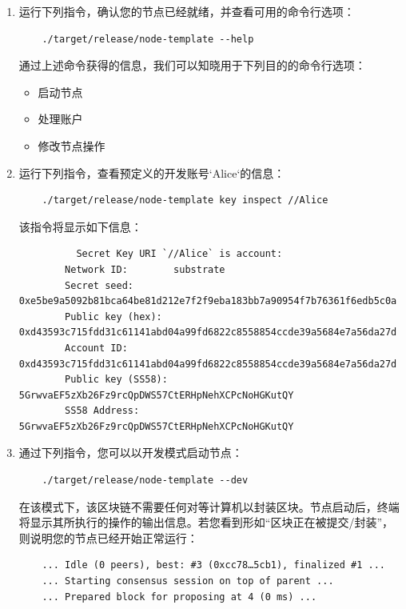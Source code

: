 \begin{enumerate}
  \item 运行下列指令，确认您的节点已经就绪，并查看可用的命令行选项：
        \begin{lstlisting}
    ./target/release/node-template --help
  \end{lstlisting}

        通过上述命令获得的信息，我们可以知晓用于下列目的的命令行选项：
        \begin{itemize}
          \item 启动节点
          \item 处理账户
          \item 修改节点操作
        \end{itemize}

  \item 运行下列指令，查看预定义的开发账号`Alice`的信息：
        \begin{lstlisting}
    ./target/release/node-template key inspect //Alice
  \end{lstlisting}
        该指令将显示如下信息：
        \begin{lstlisting}
          Secret Key URI `//Alice` is account:
        Network ID:        substrate
        Secret seed:       0xe5be9a5092b81bca64be81d212e7f2f9eba183bb7a90954f7b76361f6edb5c0a
        Public key (hex):  0xd43593c715fdd31c61141abd04a99fd6822c8558854ccde39a5684e7a56da27d
        Account ID:        0xd43593c715fdd31c61141abd04a99fd6822c8558854ccde39a5684e7a56da27d
        Public key (SS58): 5GrwvaEF5zXb26Fz9rcQpDWS57CtERHpNehXCPcNoHGKutQY
        SS58 Address:      5GrwvaEF5zXb26Fz9rcQpDWS57CtERHpNehXCPcNoHGKutQY
        \end{lstlisting}

  \item 通过下列指令，您可以以开发模式启动节点：
        \begin{lstlisting}
    ./target/release/node-template --dev
  \end{lstlisting}

        在该模式下，该区块链不需要任何对等计算机以封装区块。节点启动后，终端将显示其所执行的操作的输出信息。若您看到形如“区块正在被提交/封装”，则说明您的节点已经开始正常运行：
        \begin{lstlisting}
    ... Idle (0 peers), best: #3 (0xcc78…5cb1), finalized #1 ...
    ... Starting consensus session on top of parent ...
    ... Prepared block for proposing at 4 (0 ms) ...
  \end{lstlisting}
\end{enumerate}

